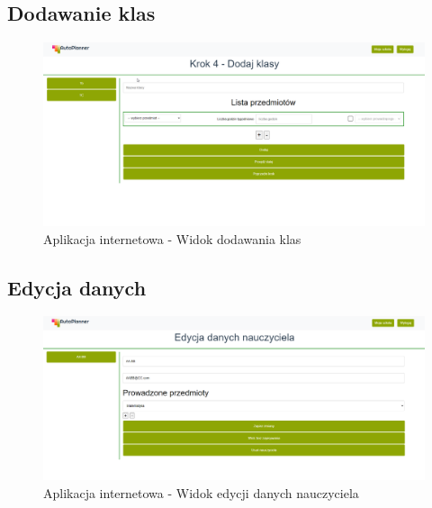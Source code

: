 \subsection{Dodawanie klas}
\begin{figure}[t]
\centering\includegraphics[width=\textwidth]{figures/class}
\caption{Aplikacja internetowa - Widok dodawania klas}\label{rys:class}
\end{figure}
\subsection{Edycja danych}
\begin{figure}[t]
\centering\includegraphics[width=\textwidth]{figures/edit}
\caption{Aplikacja internetowa - Widok edycji danych nauczyciela}\label{rys:edit}
\end{figure}





